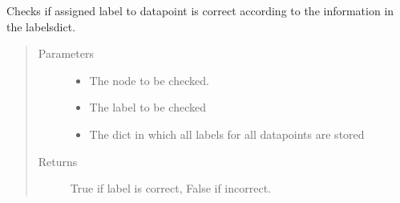 \documentclass[letterpaper,10pt,english]{sphinxmanual}
\begin{document}
\begin{fulllineitems}
\label{\detokenize{classification:classification.checkLabel}}
\sphinxAtStartPar
Checks if assigned label to datapoint is correct according to the information in the labelsdict.
\begin{quote}\begin{description}
\item[{Parameters}] \leavevmode\begin{itemize}
\item {} 
\sphinxAtStartPar
{} \textendash{} The node to be checked.

\item {} 
\sphinxAtStartPar
{} \textendash{} The label to be checked

\item {} 
\sphinxAtStartPar
{} \textendash{} The dict in which all labels for all datapoints are stored

\end{itemize}

\item[{Returns}] \leavevmode
\sphinxAtStartPar
True if label is correct, False if incorrect.

\end{description}\end{quote}

\end{fulllineitems}

\end{document}
